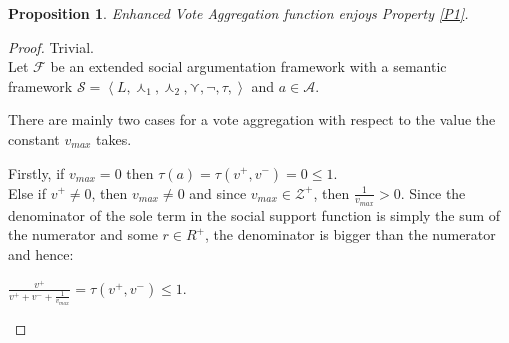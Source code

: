 \documentclass{article}
\newtheorem{proposition}{Proposition}
\newcommand{\args}{\mathcal{A}} %
\newcommand{\valueset}{L}
\newcommand{\sembodyNew}{\left\langle \valueset,\SAFand_1, \SAFand_2,\SAFor,\lnot,\tau, \right\rangle} %
\newcommand{\SAFand}{\curlywedge}     %
\newcommand{\SAFor}{\curlyvee}        %
\newcommand{\sem}{\mathcal{S}}
\begin{document}
\begin{comment}
Since $(\frac{v_1^+}{v_1^-} = \frac{v_2^+}{v_2^-})$, $\exists r \in \mathcal{R}^+$ s.t. $v_1^+ \cdot r = v_2^+$ and $v_1^- \cdot r = v_2^-$.

 \begin{align*}
    \tau(a_1) &= \frac{v^{+}_1}{v^{+}_1+v^{-}_1+\varepsilon} \cong  \frac{v^{+}_1}{v^{+}_1+v^{-}_1} \\%
         &=  \frac{v^{+}_1 \cdot r}{(v^{+}_1+v^{-}_1) \cdot r} =  \frac{v^{+}_1 \cdot r}{v^{+}_1 \cdot r + v^{-}_1 \cdot r  } \\
         &= \frac{v^{+}_2}{v^{+}_2+v^{-}_2} \cong  \frac{v^{+}_2}{v^{+}_2+v^{-}_2+\varepsilon} \\
         &= \tau(a_2)
  \end{align*}

We know that in ESAFS for any unattacked argument $a$, $\tau(a) = M(a)$ for $M \in \mathcal{M}^F_{\mathcal{S}}$. Thus
\begin{center}
$M(a_1) = \tau(a_1) = \tau(a_2) = M(a_2).$\\
CONTRADICTION!
\end{center}

\end{proof}
\end{comment}


\begin{proposition}
Enhanced Vote Aggregation function enjoys Property \ref{P1}.
\end{proposition}

\begin{proof} Trivial.
\\
Let $\mathcal{F}$ be an extended social argumentation framework with a semantic framework $\sem = \sembodyNew$ and  $a \in \args$.

There are mainly two cases for a vote aggregation with respect to the value the constant $v_{max}$ takes.

Firstly, if $v_{max} = 0$ then $\tau(a) = \tau(v^{+}, v^{-}) = 0 \le 1$. \\
Else if $v^+ \neq 0$, then $v_{max} \neq 0$ and since $v_{max} \in \mathcal{Z}^+$, then $\frac{1}{v_{max}} > 0.$ Since the denominator of the sole term in the social support function is simply the sum of the numerator and some $r \in {R}^+ $, the denominator is bigger than the numerator and hence: \\
\begin{center}
$ \frac{v^{+}}{v^{+}+v^{-}+\frac{1}{v_{max}}} = \tau(v^{+}, v^{-}) \le 1$.
\end{center}
\end{proof}
\end{document}
